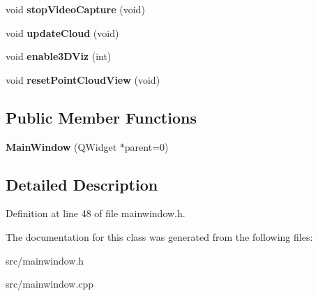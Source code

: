\begin{DoxyCompactItemize}
\item 
\hypertarget{class_main_window_af54e3f980f71743423986f0e02db7388}{}void {\bfseries stop\+Video\+Capture} (void)\label{class_main_window_af54e3f980f71743423986f0e02db7388}

\item 
\hypertarget{class_main_window_a47e2d7e70d512038267c974084913f85}{}void {\bfseries update\+Cloud} (void)\label{class_main_window_a47e2d7e70d512038267c974084913f85}

\item 
\hypertarget{class_main_window_a16db91483357c45898e93305de36a265}{}void {\bfseries enable3\+D\+Viz} (int)\label{class_main_window_a16db91483357c45898e93305de36a265}

\item 
\hypertarget{class_main_window_a58aa176ed42d6e3d5ee9827216a3b232}{}void {\bfseries reset\+Point\+Cloud\+View} (void)\label{class_main_window_a58aa176ed42d6e3d5ee9827216a3b232}

\end{DoxyCompactItemize}
\subsection*{Public Member Functions}
\begin{DoxyCompactItemize}
\item 
\hypertarget{class_main_window_a8b244be8b7b7db1b08de2a2acb9409db}{}{\bfseries Main\+Window} (Q\+Widget $\ast$parent=0)\label{class_main_window_a8b244be8b7b7db1b08de2a2acb9409db}

\end{DoxyCompactItemize}


\subsection{Detailed Description}


Definition at line 48 of file mainwindow.\+h.



The documentation for this class was generated from the following files\+:\begin{DoxyCompactItemize}
\item 
src/mainwindow.\+h\item 
src/mainwindow.\+cpp\end{DoxyCompactItemize}
